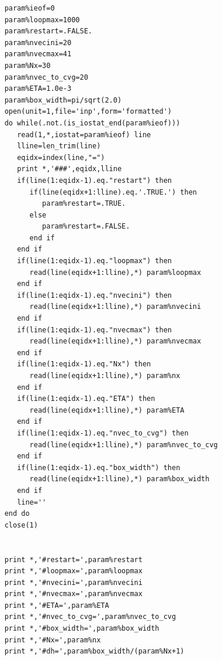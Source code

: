 \documentclass[11pt,a4paper]{article}
\begin{document}
\begin{verbatim}
    param%ieof=0
    param%loopmax=1000
    param%restart=.FALSE.
    param%nvecini=20
    param%nvecmax=41
    param%Nx=30
    param%nvec_to_cvg=20
    param%ETA=1.0e-3
    param%box_width=pi/sqrt(2.0)
    open(unit=1,file='inp',form='formatted')
    do while(.not.(is_iostat_end(param%ieof)))
       read(1,*,iostat=param%ieof) line
       lline=len_trim(line)
       eqidx=index(line,"=")
       print *,'###',eqidx,lline
       if(line(1:eqidx-1).eq."restart") then
          if(line(eqidx+1:lline).eq.'.TRUE.') then
             param%restart=.TRUE.
          else
             param%restart=.FALSE.
          end if
       end if
       if(line(1:eqidx-1).eq."loopmax") then
          read(line(eqidx+1:lline),*) param%loopmax
       end if
       if(line(1:eqidx-1).eq."nvecini") then
          read(line(eqidx+1:lline),*) param%nvecini
       end if
       if(line(1:eqidx-1).eq."nvecmax") then
          read(line(eqidx+1:lline),*) param%nvecmax
       end if
       if(line(1:eqidx-1).eq."Nx") then
          read(line(eqidx+1:lline),*) param%nx
       end if
       if(line(1:eqidx-1).eq."ETA") then
          read(line(eqidx+1:lline),*) param%ETA
       end if
       if(line(1:eqidx-1).eq."nvec_to_cvg") then
          read(line(eqidx+1:lline),*) param%nvec_to_cvg
       end if
       if(line(1:eqidx-1).eq."box_width") then
          read(line(eqidx+1:lline),*) param%box_width
       end if
       line=''
    end do
    close(1)


    print *,'#restart=',param%restart
    print *,'#loopmax=',param%loopmax
    print *,'#nvecini=',param%nvecini
    print *,'#nvecmax=',param%nvecmax
    print *,'#ETA=',param%ETA
    print *,'#nvec_to_cvg=',param%nvec_to_cvg
    print *,'#box_width=',param%box_width
    print *,'#Nx=',param%nx
    print *,'#dh=',param%box_width/(param%Nx+1)


\end{verbatim}
\end{document}
